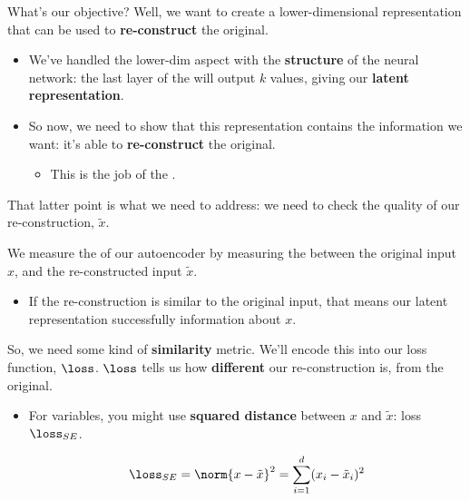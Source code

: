    What's our objective? Well, we want to create a lower-dimensional representation that can be used to \textbf{re-construct} the original.

    \begin{itemize}
        \item We've handled the lower-dim aspect with the \textbf{structure} of the neural network: the last layer of the  will output $k$ values, giving our \textbf{latent representation}.
        \item So now, we need to show that this representation contains the information we want: it's able to \textbf{re-construct} the original.
            \begin{itemize}
                \item This is the job of the .
            \end{itemize}
    \end{itemize}

    That latter point is what we need to address: we need to check the quality of our re-construction, $\tilde{x}$.\\

    \begin{concept}
        We measure the  of our autoencoder by measuring the  between the original input $x$, and the re-constructed input $\tilde{x}$.

        \begin{itemize}
            \item If the re-construction is similar to the original input, that means our latent representation successfully  information about $x$.
        \end{itemize}
    \end{concept}

    So, we need some kind of \textbf{similarity} metric. We'll encode this into our loss function, $\loss$. $\loss$ tells us how \textbf{different} our re-construction is, from the original.

    \begin{itemize}
        \item For  variables, you might use \textbf{squared distance} between $x$ and $\tilde{x}$: loss $\loss_{SE}$.

        \begin{equation}
            \loss_{SE} = \norm{x-\tilde{x}}^2 = \sum_{i=1}^d (x_i-\tilde{x}_i)^2
        \end{equation}
    \end{itemize}

